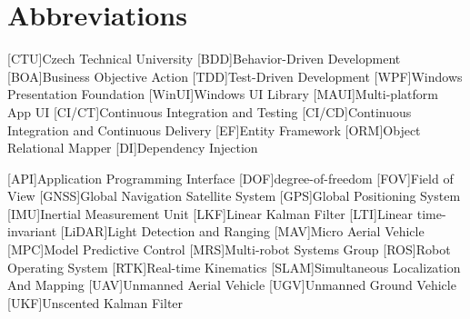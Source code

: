\section*{Abbreviations}

\begin{acronym}
[CTU]{Czech Technical University}
[BDD]{Behavior-Driven Development}
[BOA]{Business Objective Action}
[TDD]{Test-Driven Development}
[WPF]{Windows Presentation Foundation}
[WinUI]{Windows UI Library}
[MAUI]{Multi-platform App UI}
[CI/CT]{Continuous Integration and Testing}
[CI/CD]{Continuous Integration and Continuous Delivery}
[EF]{Entity Framework}
[ORM]{Object Relational Mapper}
[DI]{Dependency Injection}

[API]{Application Programming Interface}
[DOF]{degree-of-freedom}
[FOV]{Field of View}
[GNSS]{Global Navigation Satellite System}
[GPS]{Global Positioning System}
[IMU]{Inertial Measurement Unit}
[LKF]{Linear Kalman Filter}
[LTI]{Linear time-invariant}
[LiDAR]{Light Detection and Ranging}
[MAV]{Micro Aerial Vehicle}
[MPC]{Model Predictive Control}
[MRS]{Multi-robot Systems Group}
[ROS]{Robot Operating System}
[RTK]{Real-time Kinematics}
[SLAM]{Simultaneous Localization And Mapping}
[UAV]{Unmanned Aerial Vehicle}
[UGV]{Unmanned Ground Vehicle}
[UKF]{Unscented Kalman Filter}

\end{acronym}
